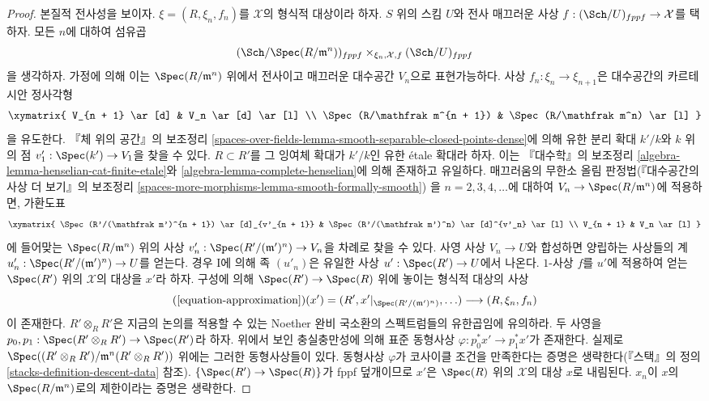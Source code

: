 \begin{proof}
\medskip\noindent
본질적 전사성을 보이자. $\xi = (R, \xi_n, f_n)$를 $\mathcal{X}$의
형식적 대상이라 하자. $S$ 위의 스킴 $U$와 전사 매끄러운 사상
$f : (\Sch/U)_{fppf} \to \mathcal{X}$를 택하자. 모든 $n$에 대하여 섬유곱
$$
(\Sch/\Spec(R/\mathfrak m^n))_{fppf}
\times_{\xi_n, \mathcal{X}, f}
(\Sch/U)_{fppf}
$$
을 생각하자. 가정에 의해 이는 $\Spec(R/\mathfrak m^n)$ 위에서 전사이고
매끄러운 대수공간 $V_n$으로 표현가능하다. 사상
$f_n : \xi_n \to \xi_{n + 1}$은 대수공간의 카르테시안 정사각형
$$
\xymatrix{
V_{n + 1} \ar[d] & V_n \ar[d] \ar[l] \\
\Spec(R/\mathfrak m^{n + 1}) & \Spec(R/\mathfrak m^n) \ar[l]
}
$$
을 유도한다. 『체 위의 공간』의 보조정리
\ref{spaces-over-fields-lemma-smooth-separable-closed-points-dense}에 의해
유한 분리 확대 $k'/k$와 $k$ 위의 점
$v'_1 : \Spec(k') \to V_1$을 찾을 수 있다. $R \subset R'$를 그 잉여체
확대가 $k'/k$인 유한 \'etale 확대라 하자. 이는 『대수학』의 보조정리
\ref{algebra-lemma-henselian-cat-finite-etale}와
\ref{algebra-lemma-complete-henselian}에 의해 존재하고 유일하다.
매끄러움의 무한소 올림 판정법(『대수공간의 사상 더 보기』의 보조정리
\ref{spaces-more-morphisms-lemma-smooth-formally-smooth})
을 $n = 2, 3, 4, \ldots$에 대하여
$V_n \to \Spec(R/\mathfrak m^n)$에 적용하면, 가환도표
$$
\xymatrix{
\Spec(R'/(\mathfrak m')^{n + 1}) \ar[d]_{v'_{n + 1}} &
\Spec(R'/(\mathfrak m')^n) \ar[d]^{v'_n} \ar[l] \\
V_{n + 1} & V_n \ar[l]
}
$$
에 들어맞는 $\Spec(R/\mathfrak m^n)$ 위의 사상
$v'_n : \Spec(R'/(\mathfrak m')^n) \to V_n$을 차례로 찾을 수 있다.
사영 사상 $V_n \to U$와 합성하면 양립하는 사상들의 계
$u'_n : \Spec(R'/(\mathfrak m')^n) \to U$를 얻는다. 경우 I에 의해
족 $(u'_n)$은 유일한 사상 $u' : \Spec(R') \to U$에서 나온다.
$1$-사상 $f$를 $u'$에 적용하여 얻는 $\Spec(R')$ 위의
$\mathcal{X}$의 대상을 $x'$라 하자. 구성에 의해
$\Spec(R') \to \Spec(R)$ 위에 놓이는 형식적 대상의 사상
$$
(\ref{equation-approximation})(x') =
(R', x'|_{\Spec(R'/(\mathfrak m')^n)}, \ldots)
\longrightarrow
(R, \xi_n, f_n)
$$
이 존재한다. %
$R' \otimes_R R'$은 지금의 논의를 적용할 수 있는 Noether 완비
국소환의 스펙트럼들의 유한곱임에 유의하라.
두 사영을 $p_0, p_1 : \Spec(R' \otimes_R R') \to \Spec(R')$라 하자.
위에서 보인 충실충만성에 의해 표준 동형사상
$\varphi : p_0^*x' \to p_1^*x'$가 존재한다. 실제로
$\Spec((R' \otimes_R R')/\mathfrak m^n(R' \otimes_R R'))$ 위에는
그러한 동형사상들이 있다. 동형사상 $\varphi$가 코사이클 조건을
만족한다는 증명은 생략한다(『스택』의 정의
\ref{stacks-definition-descent-data} 참조).
$\{\Spec(R') \to \Spec(R)\}$가 fppf 덮개이므로 $x'$은
$\Spec(R)$ 위의 $\mathcal{X}$의 대상 $x$로 내림된다.
$x_n$이 $x$의 $\Spec(R/\mathfrak m^n)$로의 제한이라는 증명은 생략한다.
\end{proof}


